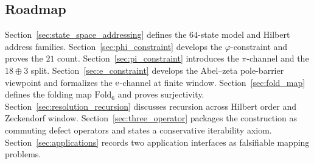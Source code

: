 \subsection{Roadmap}
Section~\ref{sec:state_space_addressing} defines the $64$-state model and Hilbert address families.
Section~\ref{sec:phi_constraint} develops the $\varphi$-constraint and proves the $21$ count.
Section~\ref{sec:pi_constraint} introduces the $\pi$-channel and the $18\oplus 3$ split.
Section~\ref{sec:e_constraint} develops the Abel--zeta pole-barrier viewpoint and formalizes the $\mathrm{e}$-channel at finite window.
Section~\ref{sec:fold_map} defines the folding map $\mathrm{Fold}_6$ and proves surjectivity.
Section~\ref{sec:resolution_recursion} discusses recursion across Hilbert order and Zeckendorf window.
Section~\ref{sec:three_operator} packages the construction as commuting defect operators and states a conservative iterability axiom.
Section~\ref{sec:applications} records two application interfaces as falsifiable mapping problems.


